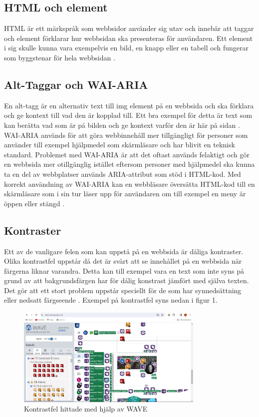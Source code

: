 \documentclass[11p]{article}
\begin{document}
    \subsection{HTML och element}
    HTML är ett märkspråk som webbsidor använder sig utav och innebär att taggar och element förklarar hur webbsidan ska presenteras för användaren.
    Ett element i sig skulle kunna vara exempelvis en bild, en knapp eller en tabell och fungerar som byggstenar för hela webbsidan \parencite{codeBean}.

    \subsection{Alt-Taggar och WAI-ARIA}
    En alt-tagg är en alternativ text till img element på en webbsida och ska förklara och ge kontext till vad den är kopplad till.
    Ett bra exempel för detta är text som kan berätta vad som är på bilden och ge kontext varför den är här på sidan \textcite{Nordström}.
    WAI-ARIA används för att göra webbinnehåll mer tillgängligt för personer som använder till exempel hjälpmedel som skärmläsare och har blivit en teknisk standard. \textcite{ARIA}
    Problemet med WAI-ARIA är att det oftast används felaktigt och gör en webbsida mer otillgänglig istället eftersom personer med hjälpmedel ska kunna ta en del av webbplatser används ARIA-attribut som stöd i HTML-kod.
    Med korrekt användning av WAI-ARIA kan en webbläsare översätta HTML-kod till en skärmläsare som i sin tur läser upp för användaren om till exempel en meny är öppen eller stängd \textcite{7minds}.


    \subsection{Kontraster}
    Ett av de vanligare felen som kan uppstå på en webbsida är dåliga kontraster.
    Olika kontrastfel uppstår då det är svårt att se innehållet på en webbsida när färgerna liknar varandra.
    Detta kan till exempel vara en text som inte syns på grund av att bakgrundsfärgen har för dålig konstrast jämfört med själva texten.
    Det gör att ett stort problem uppstår speciellt för de som har synnedsättning eller nedsatt färgseende \textcite{Digg_2021}.
    Exempel på kontrastfel syns nedan i figur 1.

    \begin{figure}[hbt!]
        \includegraphics[width=0.8\textwidth]{../images/KontrastExempel.jpg}
        \caption{ Kontrastfel hittade med hjälp av WAVE }
    \end{figure}
\end{document}
